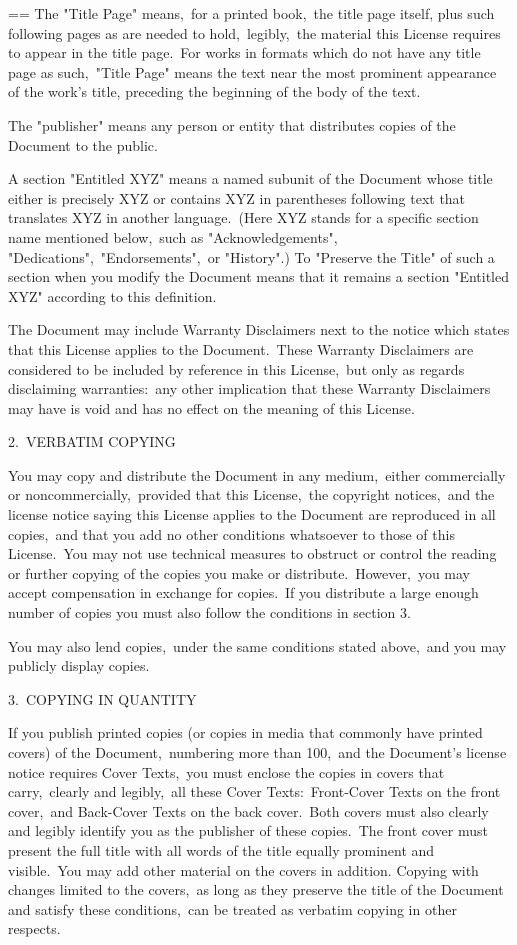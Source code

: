 \documentclass{book}
\makeatletter
\newenvironment{Texinfopreformatted}{%
  \par\GNUTobeylines\obeyspaces\frenchspacing\parskip=\z@\parindent=\z@}{}
{\catcode`\^^M=13 \gdef\GNUTobeylines{\catcode`\^^M=13 \def^^M{\null\par}}}
\newenvironment{Texinfoindented}{\begin{list}{}{}\item\relax}{\end{list}}
\renewcommand{\_}{\Texinfounderscore\discretionary{}{}{}}
\makeatother
\begin{document}
\begin{Texinfoindented}
\begin{Texinfopreformatted}
The "Title Page" means,\ for a printed book,\ the title page itself,
plus such following pages as are needed to hold,\ legibly,\ the material
this License requires to appear in the title page.\  For works in
formats which do not have any title page as such,\ "Title Page" means
the text near the most prominent appearance of the work's title,
preceding the beginning of the body of the text.

The "publisher" means any person or entity that distributes copies of
the Document to the public.

A section "Entitled XYZ" means a named subunit of the Document whose
title either is precisely XYZ or contains XYZ in parentheses following
text that translates XYZ in another language.\  (Here XYZ stands for a
specific section name mentioned below,\ such as "Acknowledgements",
"Dedications",\ "Endorsements",\ or "History".)  To "Preserve the Title"
of such a section when you modify the Document means that it remains a
section "Entitled XYZ" according to this definition.

The Document may include Warranty Disclaimers next to the notice which
states that this License applies to the Document.\  These Warranty
Disclaimers are considered to be included by reference in this
License,\ but only as regards disclaiming warranties:\ any other
implication that these Warranty Disclaimers may have is void and has
no effect on the meaning of this License.

2.\ VERBATIM COPYING

You may copy and distribute the Document in any medium,\ either
commercially or noncommercially,\ provided that this License,\ the
copyright notices,\ and the license notice saying this License applies
to the Document are reproduced in all copies,\ and that you add no
other conditions whatsoever to those of this License.\  You may not use
technical measures to obstruct or control the reading or further
copying of the copies you make or distribute.\  However,\ you may accept
compensation in exchange for copies.\  If you distribute a large enough
number of copies you must also follow the conditions in section 3.

You may also lend copies,\ under the same conditions stated above,\ and
you may publicly display copies.


3.\ COPYING IN QUANTITY

If you publish printed copies (or copies in media that commonly have
printed covers) of the Document,\ numbering more than 100,\ and the
Document's license notice requires Cover Texts,\ you must enclose the
copies in covers that carry,\ clearly and legibly,\ all these Cover
Texts:\ Front-Cover Texts on the front cover,\ and Back-Cover Texts on
the back cover.\  Both covers must also clearly and legibly identify
you as the publisher of these copies.\  The front cover must present
the full title with all words of the title equally prominent and
visible.\  You may add other material on the covers in addition.
Copying with changes limited to the covers,\ as long as they preserve
the title of the Document and satisfy these conditions,\ can be treated
as verbatim copying in other respects.


\end{Texinfopreformatted}
\end{Texinfoindented}
\end{document}
